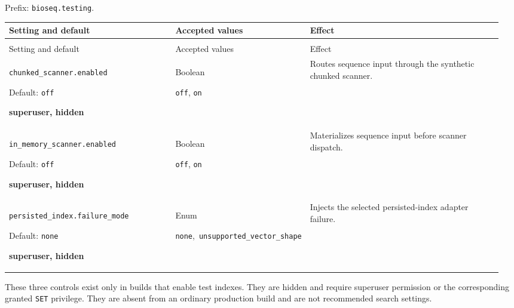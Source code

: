 Prefix: \nolinkurl{bioseq.testing}.

\begingroup
\small
\setlength{\tabcolsep}{4pt}
\renewcommand{\arraystretch}{1.16}
\begin{longtable}{@{}>{\raggedright\arraybackslash}p{0.34\linewidth}>{\raggedright\arraybackslash}p{0.22\linewidth}>{\raggedright\arraybackslash}p{0.40\linewidth}@{}}
\toprule
Setting and default & Accepted values & Effect \\
\midrule
\endfirsthead
\multicolumn{3}{@{}l}{Prefix: \nolinkurl{bioseq.testing} (continued)} \\
\toprule
Setting and default & Accepted values & Effect \\
\midrule
\endhead
\bottomrule
\endfoot
\nolinkurl{chunked_scanner.enabled}\par Default: \texttt{off}\par \textbf{superuser, hidden} & Boolean\par \texttt{off}, \texttt{on} & Routes sequence input through the synthetic chunked scanner. \\[4pt]
\nolinkurl{in_memory_scanner.enabled}\par Default: \texttt{off}\par \textbf{superuser, hidden} & Boolean\par \texttt{off}, \texttt{on} & Materializes sequence input before scanner dispatch. \\[4pt]
\nolinkurl{persisted_index.failure_mode}\par Default: \nolinkurl{none}\par \textbf{superuser, hidden} & Enum\par \nolinkurl{none},\allowbreak\ \nolinkurl{unsupported_vector_shape} & Injects the selected persisted-index adapter failure. \\[4pt]
\end{longtable}
\endgroup

These three controls exist only in builds that enable test indexes. They are
hidden and require superuser permission or the corresponding granted
\texttt{SET} privilege. They are absent from an ordinary production build and
are not recommended search settings.

